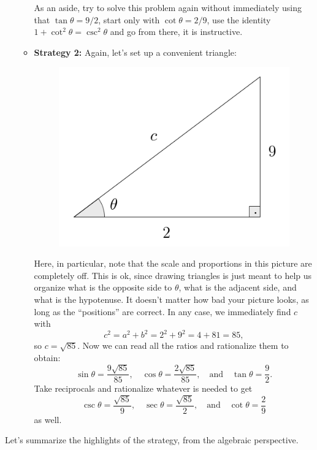 \documentclass{ximera}
\begin{document}
\begin{example}
\begin{enumerate}[label=\alph*.]
\begin{explanation}
\begin{itemize}
        As an aside, try to solve this problem again without immediately using that $\tan\theta=9/2$, start only with $\cot\theta =2/9$, use the identity $1+\cot^2\theta=\csc^2\theta$ and go from there, it is instructive.
      \item {\bf Strategy 2:} Again, let's set up a convenient triangle: \begin{figure}[h]
          \centering
          \includegraphics[scale=.3]{./figures/9-1-3-triangle-cot-2-9.png}
        \end{figure} Here, in particular, note that the scale and proportions in this picture are completely off. This is ok, since drawing triangles is just meant to help us organize what is the opposite side to $\theta$, what is the adjacent side, and what is the hypotenuse. It doesn't matter how bad your picture looks, as long as the ``positions'' are correct. In any case, we immediately find $c$ with $$c^2=a^2+b^2=2^2+9^2 = 4+81=85,$$so $c=\sqrt{85}$. Now we can read all the ratios and rationalize them to obtain: $$\sin\theta=\frac{9\sqrt{85}}{85},\quad\cos\theta=\frac{2\sqrt{85}}{85},\quad\mbox{and}\quad\tan\theta=\frac{9}{2}.$$Take reciprocals and rationalize whatever is needed to get $$\csc\theta=\frac{\sqrt{85}}{9},\quad\sec\theta=\frac{\sqrt{85}}{2},\quad\mbox{and}\quad\cot\theta=\frac{2}{9}$$as well.
      \end{itemize}
    \end{explanation}
  \end{enumerate}
\end{example}

Let's summarize the highlights of the strategy, from the algebraic perspective.
\end{document}

